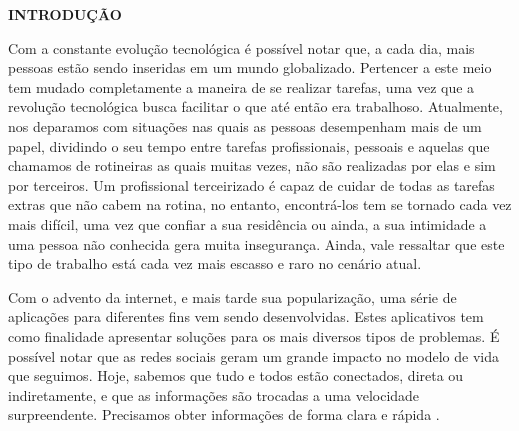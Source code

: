 \begin{flushleft}
	\vspace{1.2em}
	\textbf{\large INTRODUÇÃO}
	\vspace{2.9em}
\end{flushleft}
\thispagestyle{empty}


\par Com a constante evolução tecnológica é possível notar que, a cada dia, mais pessoas estão sendo inseridas em um mundo globalizado. Pertencer a este meio tem mudado completamente a maneira de se realizar tarefas, uma vez que a revolução tecnológica busca facilitar o que até então era trabalhoso. Atualmente, nos deparamos com situações nas quais as pessoas desempenham mais de um papel, dividindo o seu tempo entre tarefas profissionais, pessoais e aquelas que chamamos de rotineiras as quais muitas vezes, não são realizadas por elas e sim por terceiros. %
Um profissional terceirizado é capaz de cuidar de todas as tarefas extras que não cabem na rotina, no entanto, encontrá-los tem se tornado cada vez mais difícil, uma vez que confiar a sua residência ou ainda, a sua intimidade a uma pessoa não conhecida gera muita insegurança. Ainda, vale ressaltar que este tipo de trabalho está cada vez mais escasso e raro no cenário atual.

\par Com o advento da internet, e mais tarde sua popularização, uma série de aplicações para diferentes fins vem sendo desenvolvidas. Estes aplicativos tem como finalidade apresentar soluções para os mais diversos tipos de problemas. É possível notar que as redes sociais geram um grande impacto no modelo de vida que seguimos. Hoje, sabemos que tudo e todos estão conectados, direta ou indiretamente, e que as informações são trocadas a uma velocidade surpreendente. Precisamos obter informações de forma clara e rápida \cite{barbosa_why_people_use_social_network}.

